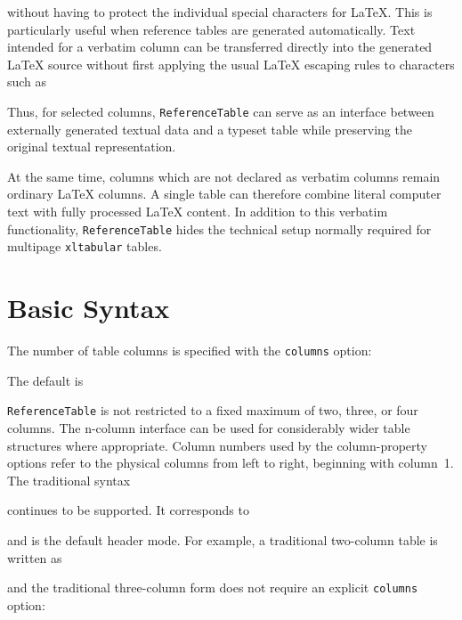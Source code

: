 \documentclass[
11pt,
a4paper,
oneside
]{scrbook}
\begin{document}


without having to protect the individual special characters for \LaTeX{}.
This is particularly useful when reference tables are generated
automatically. Text intended for a verbatim column can be transferred
directly into the generated \LaTeX{} source without first applying the usual
\LaTeX{} escaping rules to characters such as




Thus, for selected columns, \texttt{ReferenceTable} can serve as an interface
between externally generated textual data and a typeset table while
preserving the original textual representation.

At the same time, columns which are not declared as verbatim columns remain
ordinary \LaTeX{} columns. A single table can therefore combine literal
computer text with fully processed \LaTeX{} content.
In addition to this verbatim functionality, \texttt{ReferenceTable} hides the
technical setup normally required for multipage \texttt{xltabular} tables.

\section{Basic Syntax}

The number of table columns is specified with the \texttt{columns} option:




The default is




\texttt{ReferenceTable} is not restricted to a fixed maximum of two, three,
or four columns. The n-column interface can be used for considerably wider
table structures where appropriate.
Column numbers used by the column-property options refer to the physical
columns from left to right, beginning with column~1.
The traditional syntax




continues to be supported. It corresponds to




and is the default header mode.
For example, a traditional two-column table is written as




and the traditional three-column form does not require an explicit
\texttt{columns} option:
\end{document}
